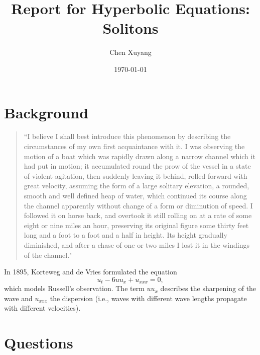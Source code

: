 \documentclass{assignment}[2019/10/15]
\title{Report for Hyperbolic Equations: Solitons}
\author{Chen Xuyang}
\date{\today}
\institute{School of Mathematical Science}
\begin{document}
    \maketitle
    \tableofcontents
    \clearpage

    \section{Background}

    \begin{quote}
        ``I believe I shall best introduce this phenomenon by describing the circumstances of my own first acquaintance with it. I was observing the motion of a boat which was rapidly drawn along a narrow channel which it had put in motion; it accumulated round the prow of the vessel in a state of violent agitation, then suddenly leaving it behind, rolled forward with great velocity, assuming the form of a large solitary elevation, a rounded, smooth and well defined heap of water, which continued its course along the channel apparently without change of a form or diminution of speed. I followed it on horse back, and overtook it still rolling on at a rate of some eight or nine miles an hour, preserving its original figure some thirty feet long and a foot to a foot and a half in height. Its height gradually diminished, and after a chase of one or two miles I lost it in the windings of the channel."
    \end{quote}

    In 1895, Korteweg and de Vries formulated the equation
    \begin{equation}\label{eqn: KdV}
        u_t - 6uu_x + u_{xxx} = 0,
    \end{equation}
    which models Russell's observation. The term $uu_x$ describes the sharpening of the wave and $u_{xxx}$ the dispersion (i.e., waves with different wave lengths propagate with different velocities).

    \section{Questions}
\end{document}
